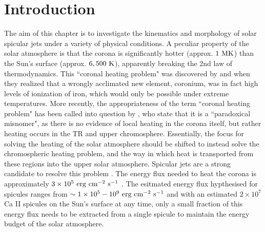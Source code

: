 \section{Introduction}
\label{sec:c2intro}
The aim of this chapter is to investigate the kinematics and morphology of solar spicular jets under a variety of physical conditions. A peculiar property of the solar atmosphere is that the corona is significantly hotter (approx. $1~\rm{MK}$) than the Sun's surface (approx. $6,500~\rm{K}$), apparently breaking the 2nd law of thermodynamics. This ``coronal heating problem" was discovered by \cite{Grotrian1939} and \cite{Edl1943} when they realized that a wrongly acclimated new element, coronium, was in fact high levels of ionization of iron, which would only be possible under extreme temperatures. More recently, the appropriateness of the term ``coronal heating problem" has been called into question by \cite{Aschwanden2007ApJ}, who state that it is a ``paradoxical misnomer", as there is no evidence of local heating in the corona itself, but rather heating occurs in the TR and upper chromosphere. Essentially, the focus for solving the heating of the solar atmosphere should be shifted to instead solve the chromospheric heating problem, and the way in which heat is transported from these regions into the upper solar atmosphere. Spicular jets are a strong candidate to resolve this problem \citep{Kudoh1999ApJ514493K, Pontieu2007PASJ, Martinez-Sykora2017,Moore2011ApJ731L18M, Pontieu2017ApJ, Samanta2019Sci, Zuo2019AcASn, Bale2019Natur}. The energy flux needed to heat the corona is approximately $3\times10^{5}~\rm{erg~cm^{-2}~s^{-1}}$ \citep{Withbroe1977ARAA15363W}. The esitmated energy flux hypthesised for spicules ranges from $\sim 1\times10^5-10^9~\rm{erg~cm^{-2}~s^{-1}}$  \citep{Athay1982ApJ255743A,Zaqarashvili_2009SSRv,Pontieu2011Sci} and with an estimated $2 \times 10^{7}$ \citep{Judge_2010ApJ} Ca II spicules on the Sun's surface at any time, only a small fraction of this energy flux needs to be extracted from a single spicule to maintain the energy budget of the solar atmosphere. \np
%
